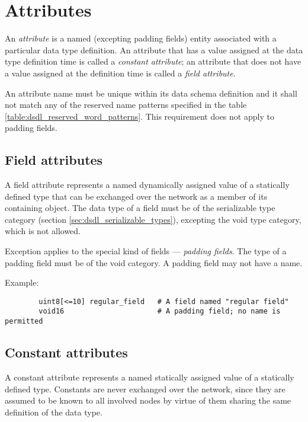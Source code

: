 \section{Attributes}\label{sec:dsdl_attributes}

An \emph{attribute} is a named (excepting padding fields) entity associated with a particular data type definition.
An attribute that has a value assigned at the data type definition time is called a \emph{constant attribute};
an attribute that does not have a value assigned at the definition time is called a \emph{field attribute}.

An attribute name must be unique within its data schema definition
and it shall not match any of the reserved name patterns specified in the table
\ref{table:dsdl_reserved_word_patterns}.
This requirement does not apply to padding fields.

\subsection{Field attributes}

A field attribute represents a named dynamically assigned value of a statically defined type
that can be exchanged over the network as a member of its containing object.
The data type of a field must be of the serializable type category (section \ref{sec:dsdl_serializable_types}),
excepting the void type category, which is not allowed.

Exception applies to the special kind of fields --- \emph{padding fields}.
The type of a padding field must be of the void category.
A padding field may not have a name.

\begin{remark}
    Example:
    \begin{verbatim}
        uint8[<=10] regular_field   # A field named "regular field"
        void16                      # A padding field; no name is permitted
    \end{verbatim}
\end{remark}

\subsection{Constant attributes}

A constant attribute represents a named statically assigned value of a statically defined type.
Constants are never exchanged over the network, since they are assumed to be known to all involved nodes
by virtue of them sharing the same definition of the data type.

